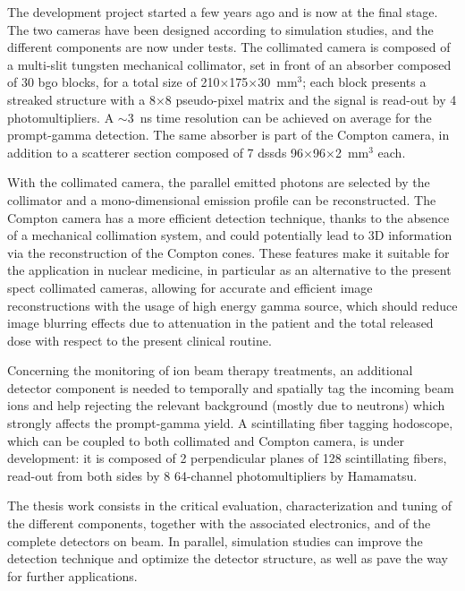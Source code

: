 The development project started a few years ago and is now at the final stage. The two cameras have been designed according to simulation studies, and the different components are now under tests.
The collimated camera is composed of a multi-slit tungsten mechanical collimator, set in front of an absorber composed of 30 \gls{bgo} blocks, for a total size of 210$\times$175$\times$30~mm$^{3}$; each block presents a streaked structure with a 8$\times$8 pseudo-pixel matrix and the signal is read-out by 4 photomultipliers. A $\sim$3~ns time resolution can be achieved on average for the prompt-gamma detection. The same absorber is part of the Compton camera, in addition to a scatterer section composed of 7 \glspl{dssd} 96$\times$96$\times$2~mm$^{3}$ each.

With the collimated camera, the parallel emitted photons are selected by the collimator and a mono-dimensional emission profile can be reconstructed. The Compton camera has a more efficient detection technique, thanks to the absence of a mechanical collimation system, and could potentially lead to 3D information via the reconstruction of the Compton cones. These features make it suitable for the application in nuclear medicine, in particular as an alternative to the present \gls{spect} collimated cameras, allowing for accurate and efficient image reconstructions with the usage of high energy gamma source, which should reduce image blurring effects due to attenuation in the patient and the total released dose with respect to the present clinical routine.
 
Concerning the monitoring of ion beam therapy treatments, an additional detector component is needed to temporally and spatially tag the incoming beam ions and help rejecting the relevant background (mostly due to neutrons) which strongly affects the prompt-gamma yield. A scintillating fiber tagging hodoscope, which can be coupled to both collimated and Compton camera, is under development: it is composed of 2 perpendicular planes of 128 scintillating fibers, read-out from both sides by 8 64-channel photomultipliers by Hamamatsu.
 
The thesis work consists in the critical evaluation, characterization and tuning of the different components, together with the associated electronics, and of the complete detectors on beam. In parallel, simulation studies can improve the detection technique and optimize the detector structure, as well as pave the way for further applications.

